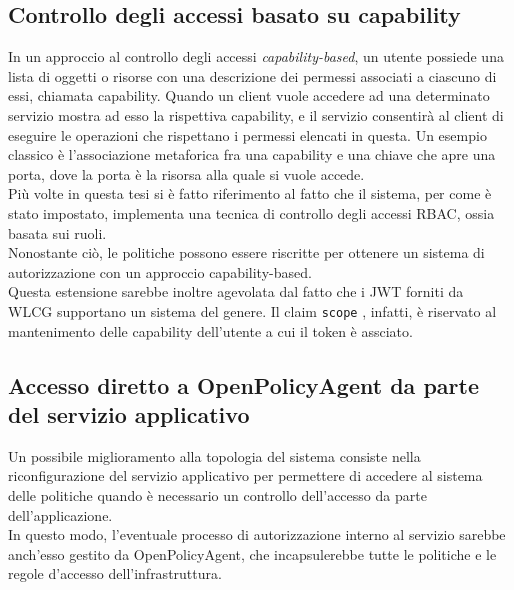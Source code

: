 \subsection{Controllo degli accessi basato su capability}
In un approccio al controllo degli accessi \textit{capability-based}, un utente possiede una lista di oggetti o risorse con una descrizione dei 
permessi associati a ciascuno di essi, chiamata capability. Quando un client vuole accedere ad una determinato servizio mostra ad esso la rispettiva
 capability, e il servizio consentirà al client di eseguire le operazioni che rispettano i permessi elencati in questa.  
 Un esempio classico è l'associazione metaforica fra una capability e una chiave che apre una porta, dove la porta è la risorsa alla quale si vuole accede.  
\\ Più volte in questa tesi si è fatto riferimento al fatto che il sistema, per come è stato impostato, implementa una tecnica 
di controllo degli accessi RBAC, ossia basata sui ruoli.
\\ Nonostante ciò, le politiche possono essere riscritte per ottenere un sistema di autorizzazione con un approccio capability-based.
\\ Questa estensione sarebbe inoltre agevolata dal fatto che i JWT forniti da WLCG supportano un sistema del genere. Il claim \texttt{scope} \cite{wlcg_jwt}, infatti,
 è riservato al mantenimento delle capability dell'utente a cui il token è assciato. 

\subsection{Accesso diretto a OpenPolicyAgent da parte del servizio applicativo}
Un possibile miglioramento alla topologia del sistema consiste nella riconfigurazione del servizio applicativo 
per permettere di accedere al sistema delle politiche quando è necessario un controllo dell'accesso da parte dell'applicazione. 
\\ In questo modo, l'eventuale processo di autorizzazione interno al servizio sarebbe anch'esso gestito da OpenPolicyAgent, 
che incapsulerebbe tutte le politiche e le regole d'accesso dell'infrastruttura.

